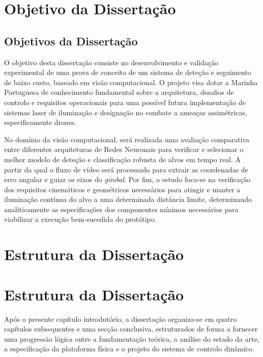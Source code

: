 \begin{introduction}
\section{Objetivo da Dissertação}


\subsection{Objetivos da Dissertação}
\label{subsec:objetivos_Dissertacao}

O objetivo desta dissertação consiste no desenvolvimento e validação experimental de uma prova de conceito de um sistema de deteção e seguimento de baixo custo, baseado em visão computacional. O projeto visa dotar a Marinha Portuguesa de conhecimento fundamental sobre a arquitetura, desafios de controlo e requisitos operacionais para uma possível futura implementação de sistemas laser de iluminação e designação no combate a ameaças assimétricas, especificamente drones. 

No domínio da visão computacional, será realizada uma avaliação comparativa entre diferentes arquiteturas de Redes Neuronais para verificar e selecionar o melhor modelo de deteção e classificação robusta de alvos em tempo real. A partir da qual o fluxo de vídeo será processado para extrair as coordenadas de erro angular e guiar os eixos do \emph{gimbal}. Por fim, o estudo foca-se na verificação dos requisitos cinemáticos e geométricos necessários para atingir e manter a iluminação contínua do alvo a uma determinada distância limite, determinando analiticamente as especificações dos componentes mínimos necessários para viabilizar a execução bem-sucedida do protótipo.

\section{Estrutura da Dissertação}

\section{Estrutura da Dissertação}
\label{sec:estrutura_dissertacao}

Após o presente capítulo introdutório, a dissertação organiza-se em quatro capítulos subsequentes e uma secção conclusiva, estruturados de forma a fornecer uma progressão lógica entre a fundamentação teórica, a análise do estado da arte, a especificação da plataforma física e o projeto do sistema de controlo dinâmico.


\end{introduction}
